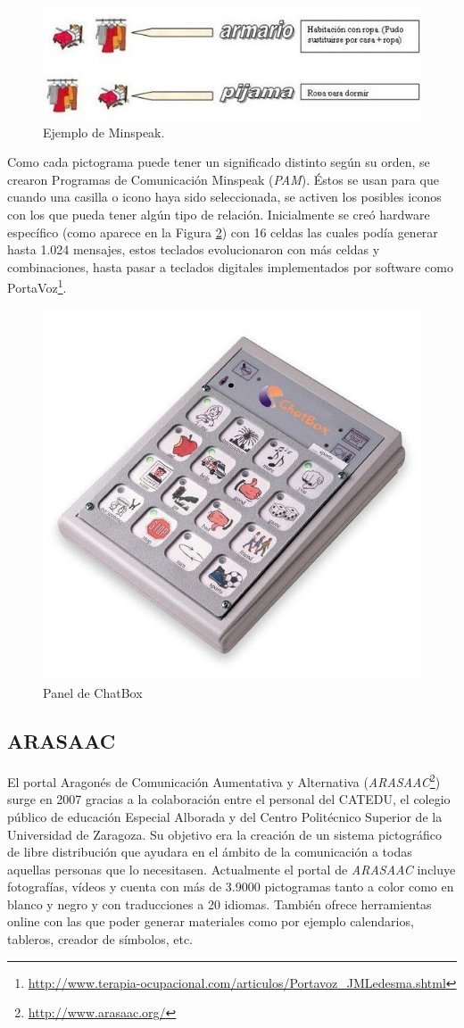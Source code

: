 \begin{figure}[h!]
	\centering
	\includegraphics[width=0.9\linewidth]{Imagenes/Bitmap/Minspeak}
	\caption{Ejemplo de Minspeak.}
	\label{fig:minspeak}
\end{figure}

Como cada pictograma puede tener un significado distinto según su orden, se crearon Programas de Comunicación Minspeak (\textit{PAM}). Éstos se usan para que cuando una casilla o icono haya sido seleccionada, se activen los posibles iconos con los que pueda tener algún tipo de relación. Inicialmente se creó hardware específico (como aparece en la Figura \ref{fig:chatbox}) con 16 celdas las cuales podía generar hasta 1.024 mensajes, estos teclados evolucionaron con más celdas y combinaciones, hasta pasar a teclados digitales implementados por software como PortaVoz\footnote{\url{http://www.terapia-ocupacional.com/articulos/Portavoz_JMLedesma.shtml}}.

\begin{figure}[h!]
	\centering
	\includegraphics[width=0.4\linewidth]{Imagenes/Bitmap/ChatBox}
	\caption[ChatBox]{Panel de ChatBox}
	\label{fig:chatbox}
\end{figure}



\subsection{ARASAAC}
\label{cap3:sec:arasaac}
El portal Aragonés de Comunicación Aumentativa y Alternativa  (\textit{ARASAAC}\footnote{\url{http://www.arasaac.org/}})
 surge en 2007 gracias a la colaboración entre el personal del CATEDU, el colegio público de educación Especial Alborada y del Centro Politécnico Superior de la Universidad de Zaragoza. Su objetivo era la creación de un sistema pictográfico de libre distribución que ayudara en el ámbito de la comunicación a todas aquellas personas que lo necesitasen.
Actualmente el portal de \textit{ARASAAC} incluye fotografías, vídeos y cuenta con más de 3.9000 pictogramas tanto a color como en blanco y negro y con traducciones a 20 idiomas. También ofrece herramientas online con las que poder generar materiales como por ejemplo calendarios, tableros, creador de símbolos, etc.

